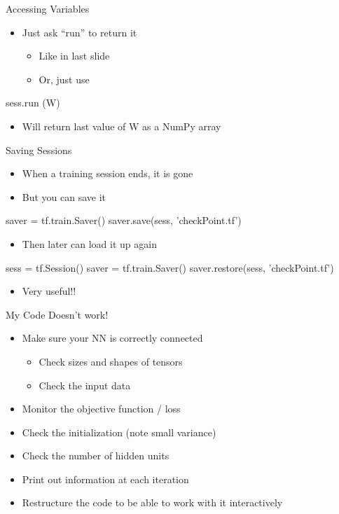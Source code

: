 \documentclass[aspectratio=169]{beamer}
\begin{document}
\begin{frame}[fragile]{Accessing Variables}

\begin{itemize}
\item Just ask ``run'' to return it 
\begin{itemize}
	\item Like in last slide
	\item Or, just use
\end{itemize}
\end{itemize}
\begin{SQL}
sess.run (W)
\end{SQL}
\begin{itemize}
	\item Will return last value of W as a NumPy array
\end{itemize}
\end{frame}
\begin{frame}[fragile]{Saving Sessions}

\begin{itemize}
\item When a training session ends, it is gone
\item But you can save it
\end{itemize}
\begin{SQL}
saver = tf.train.Saver() 
saver.save(sess, 'checkPoint.tf')
\end{SQL}
\begin{itemize}
\item Then later can load it up again
\end{itemize}
\begin{SQL}
sess = tf.Session()
saver = tf.train.Saver()
saver.restore(sess, 'checkPoint.tf')
\end{SQL}
\begin{itemize}
\item Very useful!!
\end{itemize}
\end{frame}
\begin{frame}[fragile]{My Code Doesn't work!}

\begin{itemize}
\item Make sure your NN is correctly connected
\begin{itemize}
\item Check sizes and shapes of tensors
\item Check the input data
\end{itemize}
\item Monitor the objective function / loss
\item Check the initialization (note small variance)
\item Check the number of hidden units
\item Print out information at each iteration
\item Restructure the code to be able to work with it interactively
\end{itemize}
\end{frame}
\end{document}
